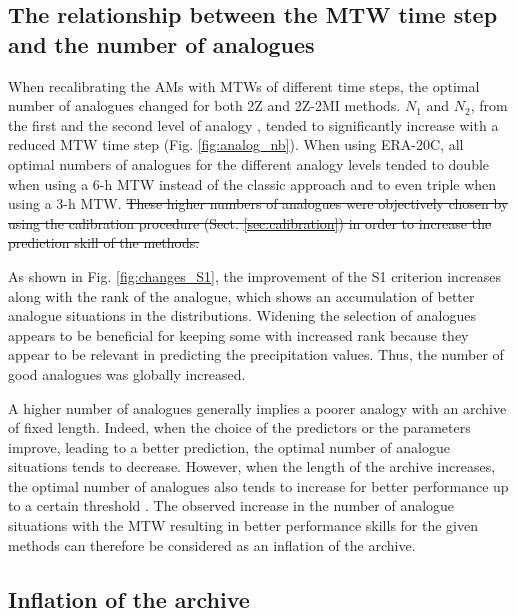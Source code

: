 \documentclass[hess, manuscript]{copernicus}
\providecommand{\DIFadd}[1]{{\protect\color{blue}\uwave{#1}}} %
\providecommand{\DIFdel}[1]{{\protect\color{red}\sout{#1}}}                      %
\providecommand{\DIFaddbegin}{} %
\providecommand{\DIFaddend}{} %
\providecommand{\DIFdelbegin}{} %
\providecommand{\DIFdelend}{} %
\begin{document}
	
	\subsection{The relationship between the MTW time step and the number of analogues}
	\label{sec:increase_analognb}

	When recalibrating the AMs with MTWs of different time steps, the optimal number of analogues changed for both 2Z and 2Z-2MI methods. $N_{1}$ and $N_{2}$, from the first and the second level of analogy \DIFaddbegin \DIFadd{respectively}\DIFaddend , tended to significantly increase with a reduced MTW time step (Fig. \ref{fig:analog_nb}). When using ERA-20C, all optimal numbers of analogues for the different analogy levels tended to double when using a 6-h MTW instead of the classic approach and to even triple when using a 3-h MTW.
	\DIFdelbegin \DIFdel{These higher numbers of analogues were objectively chosen by using the calibration procedure (Sect. \ref{sec:calibration}) in order to increase the prediction skill of the methods.
	}\DIFdelend 

	As shown in Fig. \ref{fig:changes_S1}, the improvement of the S1 criterion increases along with the rank of the analogue, which shows an accumulation of better analogue situations in the distributions. Widening the selection of analogues appears to be beneficial for keeping some with increased rank because they appear to be relevant in predicting the precipitation values. Thus, the number of good analogues was globally increased.

	A higher number of analogues generally implies a poorer analogy with an archive of fixed length. Indeed, when the choice of the predictors or the parameters improve, leading to a better prediction, the optimal number of analogue situations tends to decrease. However, when the length of the archive increases, the optimal number of analogues also tends to increase for better performance up to a certain threshold \citep[][]{Bontron2004, Hamill2006a}. The observed increase in the number of analogue situations with the MTW resulting in better performance skills for the given methods can therefore be considered as an inflation of the archive.

	
	\subsection{Inflation of the archive}
	\label{sec:archive_reduction}
\end{document}
